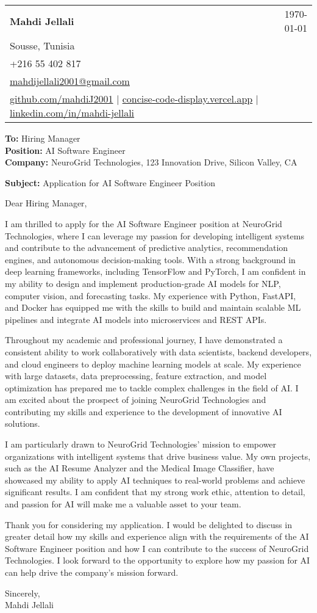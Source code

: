 \documentclass[letterpaper,11pt]{article}
\makeatletter
\newcommand{\letterHeading}[5]{
    \begin{tabular*}{\textwidth}{l@{\extracolsep{\fill}}r}
    \textbf{\Large #1} & #5 \\  %
    #2 & \\
    #3 & \\
    #4 & \\
    \end{tabular*}
    \vspace{15pt}
}
\newcommand{\letterRecipient}[3]{
    \textbf{\large To:} #1 \\
    \textbf{\large Position:} #2 \\
    \textbf{\large Company:} #3 \\
    \vspace{12pt}
}
\newcommand{\letterSubject}[1]{
    \textbf{\large Subject:} #1 \\
    \vspace{15pt}
}
\makeatother
\begin{document}
    \letterHeading
    {Mahdi Jellali}
    {Sousse, Tunisia}
    {+216 55 402 817 \\ \href{mailto:mahdijellali2001@gmail.com}{mahdijellali2001@gmail.com}}
    {\href{https://github.com/mahdiJ2001}{github.com/mahdiJ2001} $|$ \href{https://concise-code-display.vercel.app/}{concise-code-display.vercel.app} $|$ \href{https://www.linkedin.com/in/mahdi-jellali/}{linkedin.com/in/mahdi-jellali}}
    {\today}

    \letterRecipient
    {Hiring Manager}
    {AI Software Engineer}
    {NeuroGrid Technologies, 123 Innovation Drive, Silicon Valley, CA}

    \letterSubject{Application for AI Software Engineer Position}

    Dear Hiring Manager,

    I am thrilled to apply for the AI Software Engineer position at NeuroGrid Technologies, where I can leverage my passion for developing intelligent systems and contribute to the advancement of predictive analytics, recommendation engines, and autonomous decision-making tools. With a strong background in deep learning frameworks, including TensorFlow and PyTorch, I am confident in my ability to design and implement production-grade AI models for NLP, computer vision, and forecasting tasks. My experience with Python, FastAPI, and Docker has equipped me with the skills to build and maintain scalable ML pipelines and integrate AI models into microservices and REST APIs.

    Throughout my academic and professional journey, I have demonstrated a consistent ability to work collaboratively with data scientists, backend developers, and cloud engineers to deploy machine learning models at scale. My experience with large datasets, data preprocessing, feature extraction, and model optimization has prepared me to tackle complex challenges in the field of AI. I am excited about the prospect of joining NeuroGrid Technologies and contributing my skills and experience to the development of innovative AI solutions.

    I am particularly drawn to NeuroGrid Technologies' mission to empower organizations with intelligent systems that drive business value. My own projects, such as the AI Resume Analyzer and the Medical Image Classifier, have showcased my ability to apply AI techniques to real-world problems and achieve significant results. I am confident that my strong work ethic, attention to detail, and passion for AI will make me a valuable asset to your team.

    Thank you for considering my application. I would be delighted to discuss in greater detail how my skills and experience align with the requirements of the AI Software Engineer position and how I can contribute to the success of NeuroGrid Technologies. I look forward to the opportunity to explore how my passion for AI can help drive the company's mission forward.

    Sincerely,\\[12pt]

    Mahdi Jellali
\end{document}
